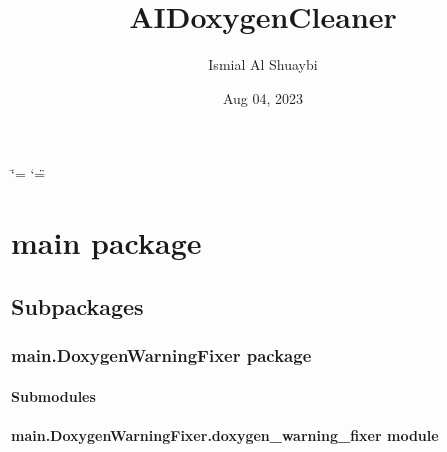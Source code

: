 \documentclass[letterpaper,10pt,english]{sphinxmanual}
\title{AI\sphinxhyphen{}DoxygenCleaner}
\date{Aug 04, 2023}
\author{Ismial Al Shuaybi}
\begin{document}
\ifdefined\shorthandoff
  \ifnum\catcode`\=\string=\active\shorthandoff{=}\fi
  \ifnum\catcode`\"=\active{}\fi
\fi

\pagestyle{empty}
\sphinxmaketitle
\pagestyle{plain}
\sphinxtableofcontents
\pagestyle{normal}
\label{\detokenize{index::doc}}


\sphinxstepscope


\chapter{main package}
\label{\detokenize{main:main-package}}\label{\detokenize{main::doc}}

\section{Subpackages}
\label{\detokenize{main:subpackages}}
\sphinxstepscope


\subsection{main.DoxygenWarningFixer package}
\label{\detokenize{main.DoxygenWarningFixer:main-doxygenwarningfixer-package}}\label{\detokenize{main.DoxygenWarningFixer::doc}}

\subsubsection{Submodules}
\label{\detokenize{main.DoxygenWarningFixer:submodules}}

\subsubsection{main.DoxygenWarningFixer.doxygen\_warning\_fixer module}
\label{\detokenize{main.DoxygenWarningFixer:module-main.DoxygenWarningFixer.doxygen_warning_fixer}}\label{\detokenize{main.DoxygenWarningFixer:main-doxygenwarningfixer-doxygen-warning-fixer-module}}
\end{document}

